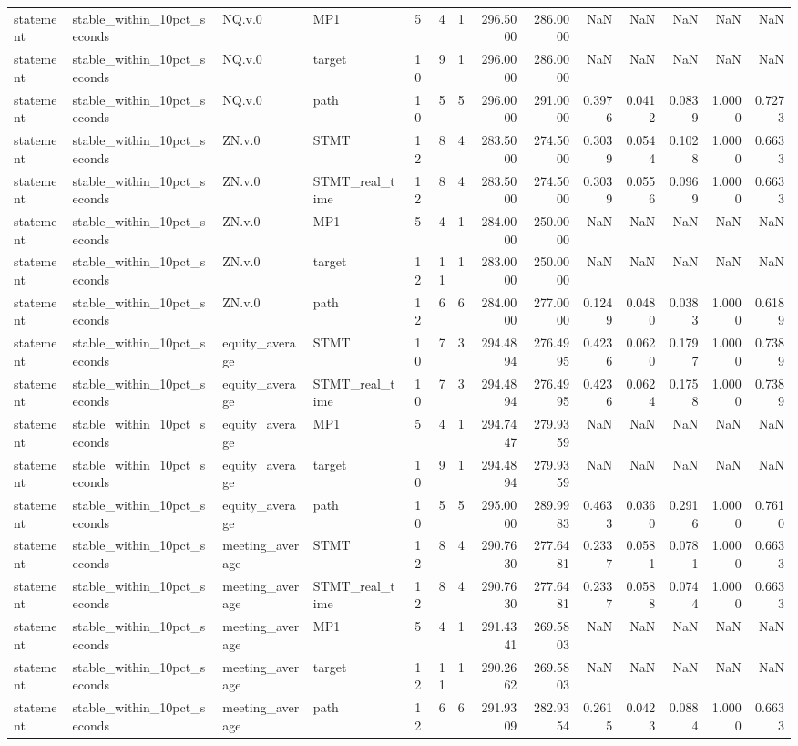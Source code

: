 \begin{tabular}{llllrrrrrrrrrr}
statement & stable_within_10pct_seconds & NQ.v.0 & MP1 & 5 & 4 & 1 & 296.5000 & 286.0000 & NaN & NaN & NaN & NaN & NaN \\
statement & stable_within_10pct_seconds & NQ.v.0 & target & 10 & 9 & 1 & 296.0000 & 286.0000 & NaN & NaN & NaN & NaN & NaN \\
statement & stable_within_10pct_seconds & NQ.v.0 & path & 10 & 5 & 5 & 296.0000 & 291.0000 & 0.3976 & 0.0412 & 0.0839 & 1.0000 & 0.7273 \\
statement & stable_within_10pct_seconds & ZN.v.0 & STMT & 12 & 8 & 4 & 283.5000 & 274.5000 & 0.3039 & 0.0544 & 0.1028 & 1.0000 & 0.6633 \\
statement & stable_within_10pct_seconds & ZN.v.0 & STMT_real_time & 12 & 8 & 4 & 283.5000 & 274.5000 & 0.3039 & 0.0556 & 0.0969 & 1.0000 & 0.6633 \\
statement & stable_within_10pct_seconds & ZN.v.0 & MP1 & 5 & 4 & 1 & 284.0000 & 250.0000 & NaN & NaN & NaN & NaN & NaN \\
statement & stable_within_10pct_seconds & ZN.v.0 & target & 12 & 11 & 1 & 283.0000 & 250.0000 & NaN & NaN & NaN & NaN & NaN \\
statement & stable_within_10pct_seconds & ZN.v.0 & path & 12 & 6 & 6 & 284.0000 & 277.0000 & 0.1249 & 0.0480 & 0.0383 & 1.0000 & 0.6189 \\
statement & stable_within_10pct_seconds & equity_average & STMT & 10 & 7 & 3 & 294.4894 & 276.4995 & 0.4236 & 0.0620 & 0.1797 & 1.0000 & 0.7389 \\
statement & stable_within_10pct_seconds & equity_average & STMT_real_time & 10 & 7 & 3 & 294.4894 & 276.4995 & 0.4236 & 0.0624 & 0.1758 & 1.0000 & 0.7389 \\
statement & stable_within_10pct_seconds & equity_average & MP1 & 5 & 4 & 1 & 294.7447 & 279.9359 & NaN & NaN & NaN & NaN & NaN \\
statement & stable_within_10pct_seconds & equity_average & target & 10 & 9 & 1 & 294.4894 & 279.9359 & NaN & NaN & NaN & NaN & NaN \\
statement & stable_within_10pct_seconds & equity_average & path & 10 & 5 & 5 & 295.0000 & 289.9983 & 0.4633 & 0.0360 & 0.2916 & 1.0000 & 0.7610 \\
statement & stable_within_10pct_seconds & meeting_average & STMT & 12 & 8 & 4 & 290.7630 & 277.6481 & 0.2337 & 0.0581 & 0.0781 & 1.0000 & 0.6633 \\
statement & stable_within_10pct_seconds & meeting_average & STMT_real_time & 12 & 8 & 4 & 290.7630 & 277.6481 & 0.2337 & 0.0588 & 0.0744 & 1.0000 & 0.6633 \\
statement & stable_within_10pct_seconds & meeting_average & MP1 & 5 & 4 & 1 & 291.4341 & 269.5803 & NaN & NaN & NaN & NaN & NaN \\
statement & stable_within_10pct_seconds & meeting_average & target & 12 & 11 & 1 & 290.2662 & 269.5803 & NaN & NaN & NaN & NaN & NaN \\
statement & stable_within_10pct_seconds & meeting_average & path & 12 & 6 & 6 & 291.9309 & 282.9354 & 0.2615 & 0.0423 & 0.0884 & 1.0000 & 0.6633 \\
\bottomrule
\end{tabular}
